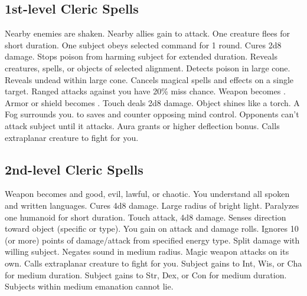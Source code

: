 \subsection{1st-level Cleric Spells}
\begin{spelllist}
 Nearby enemies are shaken.
 Nearby allies gain  to attack.
 One creature flees for short duration.
 One subject obeys selected command for 1 round.
 Cures 2d8 damage.
 Stops poison from harming subject for extended duration.
 Reveals creatures, spells, or objects of selected alignment.
 Detects poison in large cone.
 Reveals undead within large cone.
 Cancels magical spells and effects on a single target.
 Ranged attacks against you have 20\% miss chance.
 Weapon becomes .
 Armor or shield becomes .
 Touch deals 2d8 damage.
 Object shines like a torch.
 A Fog surrounds you.
  to saves and counter opposing mind control.
Opponents can't attack subject until it attacks.
 Aura grants  or higher deflection bonus.
 Calls extraplanar creature to fight for you.
\end{spelllist}

\subsection{2nd-level Cleric Spells}
\begin{spelllist}
 Weapon becomes  and good, evil, lawful, or chaotic.
 You understand all spoken and written languages.
 Cures 4d8 damage.
 Large radius of bright light.
 Paralyzes one humanoid for short duration.
 Touch attack, 4d8 damage.
 Senses direction toward object (specific or type).
 You gain  on attack and damage rolls.
 Ignores 10 (or more) points of damage/attack from specified energy type.
  Split damage with willing subject.
 Negates sound in medium radius.
 Magic weapon attacks on its own.
 Calls extraplanar creature to fight for you.
 Subject gains  to Int, Wis, or Cha for medium duration.
 Subject gains  to Str, Dex, or Con for medium duration.
 Subjects within medium emanation cannot lie.
\end{spelllist}

